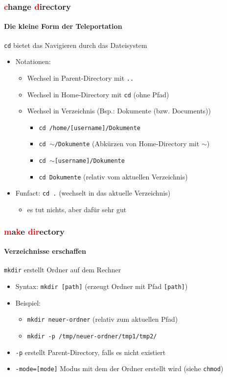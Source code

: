 \documentclass[12pt,utf8]{beamer}
\begin{document}
\begin{frame}
\frametitle{\textcolor{red}{c}hange \textcolor{red}{d}irectory}
\framesubtitle{\textcolor{ownDarkOr}{Die kleine Form der Teleportation}}
\texttt{cd} bietet das Navigieren durch das Dateisystem
\begin{itemize}
	\item Notationen:	
	\begin{itemize}[<+->]
		\item Wechsel in Parent-Directory mit \texttt{..}
		\item Wechsel in Home-Directory mit \texttt{cd}   (ohne Pfad)
		\item Wechsel in Verzeichnis (Bsp.: Dokumente (bzw. Documents))
		\begin{itemize}[<+->]
			\item \texttt{cd /home/[username]/Dokumente}
			\item \texttt{cd $\sim$/Dokumente}   (Abkürzen von Home-Directory mit $\sim$)
			\item \texttt{cd $\sim$[username]/Dokumente}
			\item \texttt{cd Dokumente}    (relativ vom aktuellen Verzeichnis)
		\end{itemize}
	\end{itemize}
	\item Funfact: \texttt{cd .}  (wechselt in das aktuelle Verzeichnis)
	\begin{itemize}
		\item es tut nichts, aber dafür sehr gut
	\end{itemize}
\end{itemize}
\end{frame}

\begin{frame}
\frametitle{\textcolor{red}{m}a\textcolor{red}{k}e \textcolor{red}{dir}ectory}
\framesubtitle{\textcolor{ownDarkOr}{Verzeichnisse erschaffen}}
\texttt{mkdir} erstellt Ordner auf dem Rechner
\begin{itemize}
	\item Syntax: \texttt{mkdir [path]}   (erzeugt Ordner mit Pfad \texttt{[path]})
	\item Beispiel:
	\begin{itemize}[<+->]
		\item \texttt{mkdir neuer-ordner}    (relativ zum aktuellen Pfad)
		\item \texttt{mkdir -p /tmp/neuer-ordner/tmp1/tmp2/}
	\end{itemize}
	\item \texttt{-p}   erstellt Parent-Directory, falls es nicht existiert
	\item \texttt{-mode=[mode]}  Modus mit dem der Ordner erstellt wird (siehe \texttt{chmod})
\end{itemize}
\end{frame}
\end{document}
